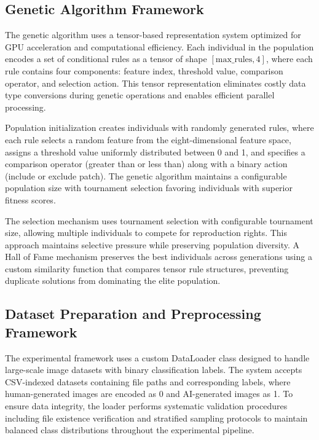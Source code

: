 \documentclass[runningheads]{llncs}
\begin{document}
\subsection{Genetic Algorithm Framework}
The genetic algorithm uses a tensor-based representation system optimized for GPU acceleration and computational efficiency. Each individual in the population encodes a set of conditional rules as a tensor of shape $[\text{max\_rules}, 4]$, where each rule contains four components: feature index, threshold value, comparison operator, and selection action. This tensor representation eliminates costly data type conversions during genetic operations and enables efficient parallel processing.

Population initialization creates individuals with randomly generated rules, where each rule selects a random feature from the eight-dimensional feature space, assigns a threshold value uniformly distributed between 0 and 1, and specifies a comparison operator (greater than or less than) along with a binary action (include or exclude patch). The genetic algorithm maintains a configurable population size with tournament selection favoring individuals with superior fitness scores.

The selection mechanism uses tournament selection with configurable tournament size, allowing multiple individuals to compete for reproduction rights. This approach maintains selective pressure while preserving population diversity. A Hall of Fame mechanism preserves the best individuals across generations using a custom similarity function that compares tensor rule structures, preventing duplicate solutions from dominating the elite population.

\subsection{Dataset Preparation and Preprocessing Framework}
The experimental framework uses a custom DataLoader class designed to handle large-scale image datasets with binary classification labels. The system accepts CSV-indexed datasets containing file paths and corresponding labels, where human-generated images are encoded as 0 and AI-generated images as 1. To ensure data integrity, the loader performs systematic validation procedures including file existence verification and stratified sampling protocols to maintain balanced class distributions throughout the experimental pipeline.
\end{document}
